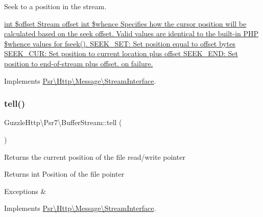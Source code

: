 Seek to a position in the stream.

\hyperlink{}{int \$offset Stream offset  int \$whence Specifies how the cursor position will be calculated based on the seek offset. Valid values are identical to the built-\/in P\+HP \$whence values for {\ttfamily fseek()}. S\+E\+E\+K\+\_\+\+S\+E\+T\+: Set position equal to offset bytes S\+E\+E\+K\+\_\+\+C\+U\+R\+: Set position to current location plus offset S\+E\+E\+K\+\_\+\+E\+N\+D\+: Set position to end-\/of-\/stream plus offset.   on failure. }

Implements \hyperlink{interfacePsr_1_1Http_1_1Message_1_1StreamInterface_a96ee062dc6cf4022d655dd15eaa81208}{Psr\textbackslash{}\+Http\textbackslash{}\+Message\textbackslash{}\+Stream\+Interface}.

\mbox{\label{classGuzzleHttp_1_1Psr7_1_1BufferStream_aac11a7ec7fcae9038f7beb6f374111a9}} 
\subsubsection{\texorpdfstring{tell()}{tell()}}
{\footnotesize\ttfamily Guzzle\+Http\textbackslash{}\+Psr7\textbackslash{}\+Buffer\+Stream\+::tell (\begin{DoxyParamCaption}{ }\end{DoxyParamCaption})}

Returns the current position of the file read/write pointer

\begin{DoxyReturn}{Returns}
int Position of the file pointer 
\end{DoxyReturn}

\begin{DoxyExceptions}{Exceptions}
{\em } & \\
\hline
\end{DoxyExceptions}


Implements \hyperlink{interfacePsr_1_1Http_1_1Message_1_1StreamInterface_a9aa2f88a38f496d74100f42ddf0656ef}{Psr\textbackslash{}\+Http\textbackslash{}\+Message\textbackslash{}\+Stream\+Interface}.

\mbox{\label{classGuzzleHttp_1_1Psr7_1_1BufferStream_a2cd1b760c6feef31b410f41940ec708b}} 
